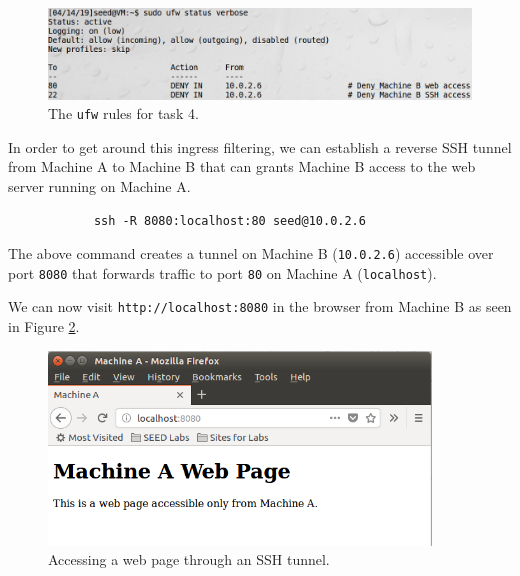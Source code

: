 \documentclass[12pt,letterpaper]{article}
\begin{document}
		\begin{figure}[h]
			\begin{center}
				\includegraphics[width=\linewidth]{task-4-ufw-rules}
			\end{center}
			\caption{The \texttt{ufw} rules for task 4.}
			\label{fig:task-4-ufw-rules}
		\end{figure}
	
		In order to get around this ingress filtering, we can establish a reverse SSH tunnel from Machine A to Machine B that can grants Machine B access to the web server running on Machine A.
		
		\begin{verbatim}
			ssh -R 8080:localhost:80 seed@10.0.2.6
		\end{verbatim}
		
		The above command creates a tunnel on Machine B (\texttt{10.0.2.6}) accessible over port \texttt{8080} that forwards traffic to port \texttt{80} on Machine A (\texttt{localhost}).
		
		We can now visit \texttt{http://localhost:8080} in the browser from Machine B as seen in Figure \ref{fig:task-4-web-access}.
		
		\begin{figure}[h]
			\begin{center}
				\includegraphics[width=4in]{task-4-web-access}
			\end{center}
			\caption{Accessing a web page through an SSH tunnel.}
			\label{fig:task-4-web-access}
		\end{figure}
\end{document}
